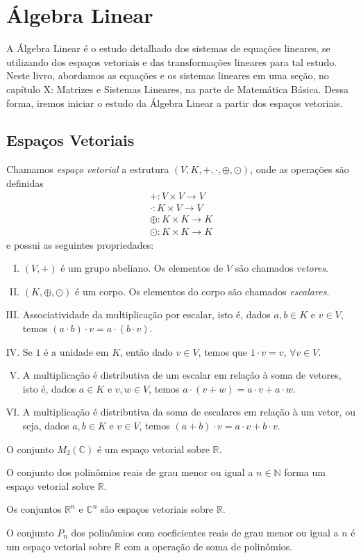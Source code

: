 \chapter{Álgebra Linear}

A Álgebra Linear é o estudo detalhado dos sistemas de equações lineares, se utilizando dos espaços vetoriais e das transformações lineares para tal estudo. Neste livro, abordamos as equações e os sistemas lineares em uma seção, no capítulo X: Matrizes e Sistemas Lineares, na parte de Matemática Básica. Dessa forma, iremos iniciar o estudo da Álgebra Linear a partir dos espaços vetoriais.

\section{Espaços Vetoriais}
\begin{df}
Chamamos \emph{espaço vetorial} a estrutura $(V,K,+,\cdot,\oplus,\odot)$, onde as operações são definidas
\begin{align*}
+ : V \times V \longrightarrow V \\
\cdot : K \times V \longrightarrow V \\
\oplus : K \times K \longrightarrow K \\
\odot : K \times K \longrightarrow K
\end{align*}
e possui as seguintes propriedades:
\begin{enumerate}[I.]
\item $(V,+)$ é um grupo abeliano. Os elementos de $V$ são chamados \emph{vetores}.
\item $(K,\oplus,\odot)$ é um corpo. Os elementos do corpo são chamados \emph{escalares}.
\item Associatividade da multiplicação por escalar, isto é, dados $a,b \in K$ e $v \in V$, temos $(a \cdot b) \cdot v=a\cdot(b\cdot v)$.
\item Se $1$ é a unidade em $K$, então dado $v \in V$, temos que $1 \cdot v = v$, $\forall v \in V$.
\item A multiplicação é distributiva de um escalar em relação à soma de vetores, isto é, dados $a \in K$ e $v,w \in V$, temos $a\cdot (v+w)=a\cdot v + a \cdot w$.
\item A multiplicação é distributiva da soma de escalares em relação à um vetor, ou seja, dados $a,b \in K$ e $v \in V$, temos $(a+b)\cdot v= a\cdot v + b \cdot v$.
\end{enumerate}
\end{df}

\begin{exemplo}
O conjunto $M_2(\mathbb{C})$ é um espaço vetorial sobre $\mathbb{R}$. \par 
O conjunto dos polinômios reais de grau menor ou igual a $n\in\mathbb{N}$ forma um espaço vetorial sobre $\mathbb{R}$. \par 
Os conjuntos $\mathbb{R}^n$ e $\mathbb{C}^n$ são espaços vetoriais sobre $\mathbb{R}$. \par
O conjunto $P_n$ dos polinômios com coeficientes reais de grau menor ou igual a $n$ é um espaço vetorial sobre $\mathbb{R}$ com a operação de soma de polinômios.
\end{exemplo}